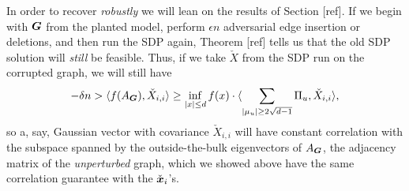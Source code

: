 In order to recover \emph{robustly} we will lean on the results of Section [ref]. If we begin with $\boldsymbol{G}$ from the planted model, perform $\epsilon n$ adversarial edge insertion or deletions, and then run the SDP again, Theorem [ref] tells us that the old SDP solution will \emph{still} be feasible. Thus, if we take $\check X$ from the SDP run on the corrupted graph, we will still have
\begin{align*}
	-\delta n > \langle f(A_{\boldsymbol{G}}), \check X_{i,i} \rangle \ge \inf_{|x| \le d} f(x) \cdot \langle \sum_{|\mu_u| \ge 2\sqrt{d-1}} \Pi_u, \check X_{i,i} \rangle,
\end{align*}
so a, say, Gaussian vector with covariance $\check X_{i,i}$ will have constant correlation with the subspace spanned by the outside-the-bulk eigenvectors of $A_{\boldsymbol{G}}$, the adjacency matrix of the \emph{unperturbed} graph, which we showed above have the same correlation guarantee with the $\check {{\boldsymbol{x}}}_{i}$'s.

